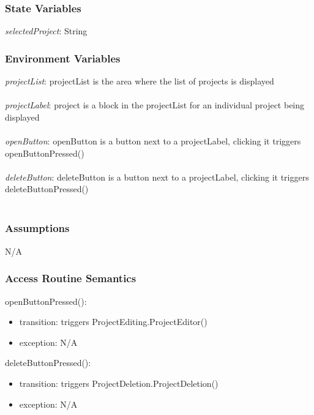 \documentclass[12pt, titlepage]{article}
\begin{document}
	\subsubsection{State Variables}
	\textit{selectedProject}: String
	
	\subsubsection{Environment Variables}
	
	\textit{projectList}: projectList is the area where the list of projects is displayed \\\\ 
	\textit{projectLabel}: project is a block in the projectList for an individual project being displayed\\\\
	\textit{openButton}: openButton is a button next to a projectLabel, clicking it triggers openButtonPressed()\\\\
	\textit{deleteButton}: deleteButton is a button next to a projectLabel, clicking it triggers deleteButtonPressed() \\\\
	
	\subsubsection{Assumptions}
	N/A
	
	\subsubsection{Access Routine Semantics}
	
	\noindent openButtonPressed():
	\begin{itemize}
		\item transition: triggers ProjectEditing.ProjectEditor()
		\item exception: N/A
	\end{itemize}
	
	\noindent deleteButtonPressed():
	\begin{itemize}
		\item transition: triggers ProjectDeletion.ProjectDeletion()
		\item exception: N/A
	\end{itemize}
	
\end{document}
